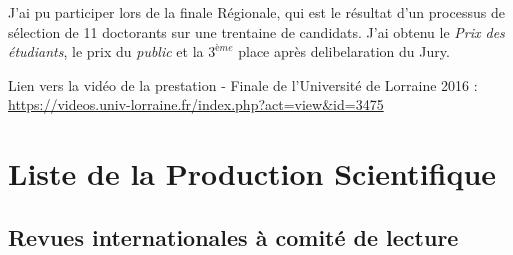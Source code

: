 \documentclass[
  12pt,
  oneside]{book}
\begin{document}
J'ai pu participer lors de la finale Régionale, qui est le résultat d'un processus de sélection de 11 doctorants sur une trentaine de candidats.
J'ai obtenu le \textit{Prix des étudiants}, le prix du \textit{public} et la \(3^{ème}\) place après delibelaration du Jury.

Lien vers la vidéo de la prestation - Finale de l'Université de Lorraine 2016 :
\url{https://videos.univ-lorraine.fr/index.php?act=view&id=3475}

\newpage

\appendix

\hypertarget{articles}{%
\chapter{Liste de la Production Scientifique}\label{articles}}

\hypertarget{revues-internationales-uxe0-comituxe9-de-lecture}{%
\section{Revues internationales à comité de lecture}\label{revues-internationales-uxe0-comituxe9-de-lecture}}
\end{document}
